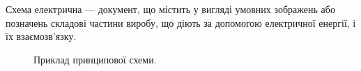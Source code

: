 \documentclass[a4paper,14pt]{extreport}
\begin{document}
Схема електрична --- документ, що містить у вигляді умовних зображень або позначень складові частини виробу, що діють за допомогою електричної енергії, і їх взаємозв'язку.

\begin{figure}[h]
  \caption{Приклад принципової схеми.}
  \label{ris2}
\end{figure}
\end{document}
